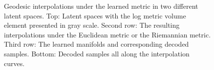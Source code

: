 \documentclass[10pt,journal,compsoc]{IEEEtran}
\begin{document}
  \begin{figure}[!t]
    \centering
    \hfil
    \centering
    \vfil
    \vspace{-1.2em}
    \hfil
    \vfil
    \vspace{-1em}
    \vfil
    \centering
    \vspace{-1em}
    \caption{Geodesic interpolations under the learned metric in two different latent spaces. Top: Latent spaces with the log metric volume element presented in gray scale. Second row: The resulting interpolations under the Euclidean metric or the Riemannian metric. Third row: The learned manifolds and corresponding decoded samples. Bottom: Decoded samples all along the interpolation curves.}
    \label{Fig: Geodesic computation}
    \end{figure}
\end{document}
